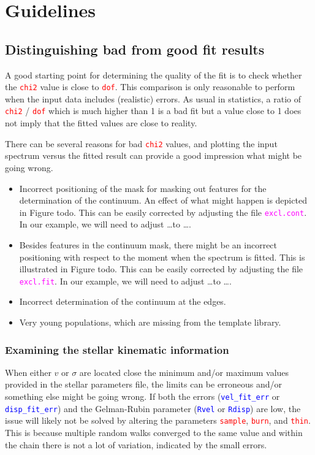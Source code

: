 \documentclass[usenatbib,usegraphicx,useAMS,onecolumn]{mn2e}
\newcommand{\codeline}[1]{\lstinline|#1|}
\newcommand{\paramdef}[1]{\textcolor{red}{\codeline{#1}}}
\newcommand{\tblcol}[1]{\textcolor{blue}{\codeline{#1}}}
\newcommand{\fname}[1]{\textcolor{magenta}{\codeline{#1}}}
\begin{document}
\section{Guidelines}
\label{sec:guidelines}
\subsection{}
\subsection{Distinguishing bad from good fit results}
\label{subsec:guidelines_bad_vs_good}
A good starting point for determining the quality of the fit is to check whether the \paramdef{chi2} value is close to \paramdef{dof}.
This comparison is only reasonable to perform when the input data includes (realistic) errors.
As usual in statistics, a ratio of \paramdef{chi2} / \paramdef{dof} which is much higher than 1 is a bad fit but a value close to 1 does not imply that the fitted values are close to reality.

There can be several reasons for bad \paramdef{chi2} values, and plotting the input spectrum versus the fitted result can provide a good impression what might be going wrong.
\begin{itemize}
    \item Incorrect positioning of the mask for masking out features for the determination of the continuum.
        An effect of what might happen is depicted in Figure todo.
        This can be easily corrected by adjusting the file \fname{excl.cont}.
        In our example, we will need to adjust \ldots to \ldots.
    \item Besides features in the continuum mask, there might be an incorrect positioning with respect to the moment when the spectrum is fitted.
        This is illustrated in Figure todo.
        This can be easily corrected by adjusting the file \fname{excl.fit}.
        In our example, we will need to adjust \ldots to \ldots.
    \item Incorrect determination of the continuum at the edges.
    \item Very young populations, which are missing from the template library.
\end{itemize}

\subsubsection{Examining the stellar kinematic information}
When either $v$ or $\sigma$ are located close the minimum and/or maximum values provided in the stellar parameters file, the limits can be erroneous and/or something else might be going wrong.
If both the errors (\tblcol{vel_fit_err} or \tblcol{disp_fit_err}) and the Gelman-Rubin parameter (\tblcol{Rvel} or \tblcol{Rdisp}) are low, the issue will likely not be solved by altering the parameters \paramdef{sample}, \paramdef{burn}, and \paramdef{thin}.
This is because multiple random walks converged to the same value and within the chain there is not a lot of variation, indicated by the small errors.
\end{document}
